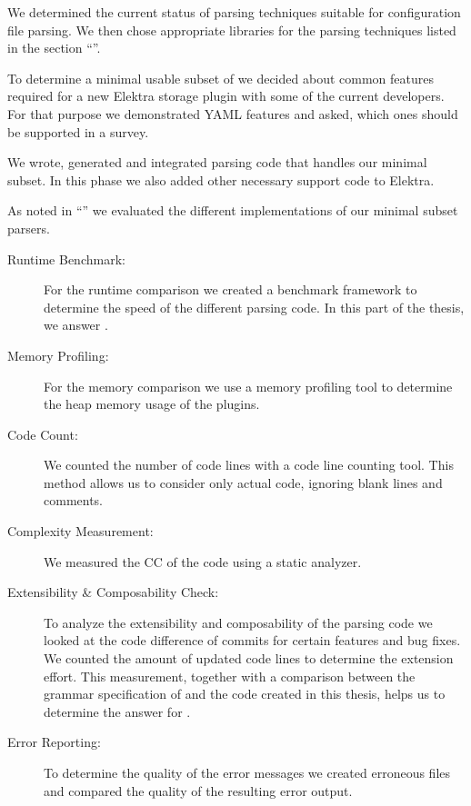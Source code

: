 \begin{description}[style=multiline, leftmargin=3.2cm, font=\bfseries]

  \item[Literature Review] We determined the current status of parsing techniques suitable for configuration file parsing. We then chose appropriate libraries for the parsing techniques listed in the section “”.

  \item[Discussion] To determine a minimal usable subset of  we decided about common features required for a new Elektra storage plugin with some of the current developers. For that purpose we demonstrated YAML features and asked, which ones should be supported in a survey.

  \item[Implementation] We wrote, generated and integrated parsing code that handles our minimal  subset. In this phase we also added other necessary support code to Elektra.

  \item[Comparison] As noted in “” we evaluated the different implementations of our minimal  subset parsers.

  \begin{description}
    \item[Runtime Benchmark:] For the runtime comparison we created a benchmark framework to determine the speed of the different parsing code. In this part of the thesis, we answer .

    \item[Memory Profiling:] For the memory comparison we use a memory profiling tool to determine the heap memory usage of the  plugins.

    \item[Code Count:] We counted the number of code lines with a code line counting tool. This method allows us to consider only actual code, ignoring blank lines and comments.

    \item[Complexity Measurement:] We measured the \gls{CC} of the code using a static analyzer.

    \item[Extensibility \& Composability Check:] To analyze the extensibility and composability of the parsing code we looked at the code difference of commits for certain features and bug fixes. We counted the amount of updated code lines to determine the extension effort. This measurement, together with a comparison between the grammar specification of  and the code created in this thesis, helps us to determine the answer for .

    \item[Error Reporting:] To determine the quality of the error messages we created erroneous files and compared the quality of the resulting error output.
  \end{description}

\end{description}

